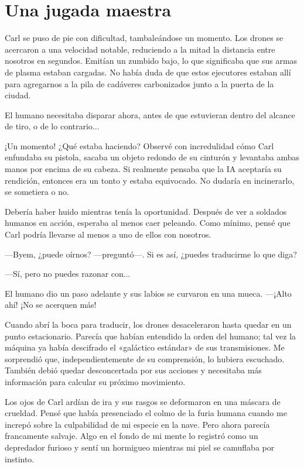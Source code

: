 \chapter{Una jugada maestra}

Carl se puso de pie con dificultad, tambaleándose un momento. Los drones se acercaron a una velocidad notable, reduciendo a la mitad la distancia entre nosotros en segundos. Emitían un zumbido bajo, lo que significaba que sus armas de plasma estaban cargadas. No había duda de que estos ejecutores estaban allí para agregarnos a la pila de cadáveres carbonizados junto a la puerta de la ciudad.

El humano necesitaba disparar ahora, antes de que estuvieran dentro del alcance de tiro, o de lo contrario...

¡Un momento! ¿Qué estaba haciendo? Observé con incredulidad cómo Carl enfundaba su pistola, sacaba un objeto redondo de su cinturón y levantaba ambas manos por encima de su cabeza. Si realmente pensaba que la IA aceptaría su rendición, entonces era un tonto y estaba equivocado. No dudaría en incinerarlo, se sometiera o no.

Debería haber huido mientras tenía la oportunidad. Después de ver a soldados humanos en acción, esperaba al menos caer peleando. Como mínimo, pensé que Carl podría llevarse al menos a uno de ellos con nosotros.

—Byem, ¿puede oírnos? —preguntó—. Si es así, ¿puedes traducirme lo que diga?

—Sí, pero no puedes razonar con...

El humano dio un paso adelante y sus labios se curvaron en una mueca. —¡Alto ahí! ¡No se acerquen más!

Cuando abrí la boca para traducir, los drones desaceleraron hasta quedar en un punto estacionario. Parecía que habían entendido la orden del humano; tal vez la máquina ya había descifrado el «galáctico estándar» de sus transmisiones. Me sorprendió que, independientemente de su comprensión, lo hubiera escuchado. También debió quedar desconcertada por sus acciones y necesitaba más información para calcular su próximo movimiento.

Los ojos de Carl ardían de ira y sus rasgos se deformaron en una máscara de crueldad. Pensé que había presenciado el colmo de la furia humana cuando me increpó sobre la culpabilidad de mi especie en la nave. Pero ahora parecía francamente salvaje. Algo en el fondo de mi mente lo registró como un depredador furioso y sentí un hormigueo mientras mi piel se camuflaba por instinto.

